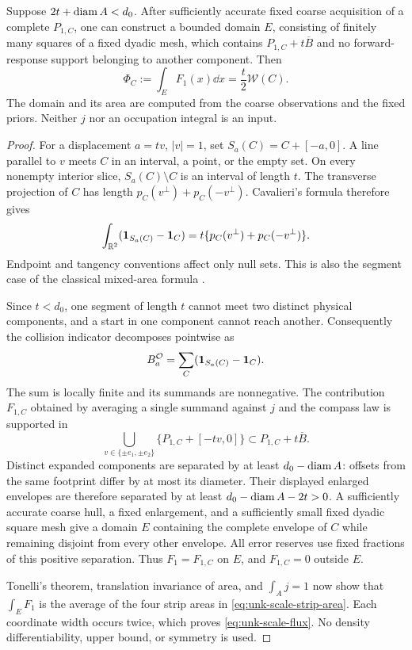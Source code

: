 \begin{lemma}
\label{lem:unk-scale-flux}
Suppose $2t+\operatorname{diam} A<d_0$. After sufficiently accurate fixed coarse
acquisition of a complete $P_{1,C}$, one can construct a bounded
domain $E$, consisting of finitely many squares of a fixed dyadic
mesh, which contains $P_{1,C}+t\overline B$ and no forward-response
support belonging to another component. Then
\begin{equation}\label{eq:unk-scale-flux}
 \Phi_C:=\int_E F_1(x)\dd x
                      =\frac t2\mathcal W(C).
\end{equation}
The domain and its area are computed from the coarse observations and
the fixed priors. Neither $j$ nor an occupation integral is an input.
\end{lemma}
\begin{proof}
For a displacement $a=tv$, $|v|=1$, set
$S_a(C)=C+[-a,0]$. A line parallel to $v$ meets $C$ in an interval,
a point, or the empty set. On every nonempty interior slice,
$S_a(C)\setminus C$ is an interval of length $t$. The transverse
projection of $C$ has length
$p_C(v^\perp)+p_C(-v^\perp)$. Cavalieri's formula therefore gives
\begin{equation}\label{eq:unk-scale-strip-area}
 \int_{\mathbb R^2}
       (\mathbf 1_{S_a(C)}-\mathbf 1_C)
   =t\{p_C(v^\perp)+p_C(-v^\perp)\}.
\end{equation}
Endpoint and tangency conventions affect only null sets. This is also
the segment case of the classical mixed-area formula \cite{Schneider}.

Since $t<d_0$, one segment of length $t$ cannot meet two distinct
physical components, and a start in one component cannot reach another.
Consequently the collision indicator decomposes pointwise as
\[
 B_a^{\mathcal O}
       =\sum_C(\mathbf 1_{S_a(C)}-\mathbf 1_C).
\]
The sum is locally finite and its summands are nonnegative. The
contribution $F_{1,C}$ obtained by averaging a single summand against
$j$ and the compass law is supported in
\[
 \bigcup_{v\in\{\pm e_1,\pm e_2\}}
       \{P_{1,C}+[-tv,0]\}
                    \subset P_{1,C}+t\overline B.
\]
Distinct expanded components are separated by at least
$d_0-\operatorname{diam} A$: offsets from the same footprint differ by at most its
diameter. Their displayed enlarged envelopes are therefore separated
by at least $d_0-\operatorname{diam} A-2t>0$. A sufficiently accurate coarse hull,
a fixed enlargement, and a sufficiently small fixed dyadic square mesh
give a domain $E$ containing the complete envelope of $C$ while
remaining disjoint from every other envelope. All error reserves use
fixed fractions of this positive separation. Thus $F_1=F_{1,C}$ on
$E$, and $F_{1,C}=0$ outside $E$.

Tonelli's theorem, translation invariance of area, and $\int_Aj=1$
now show that $\int_EF_1$ is the average of the four strip areas in
\eqref{eq:unk-scale-strip-area}. Each coordinate width occurs twice,
which proves \eqref{eq:unk-scale-flux}. No density differentiability,
upper bound, or symmetry is used.
\end{proof}

